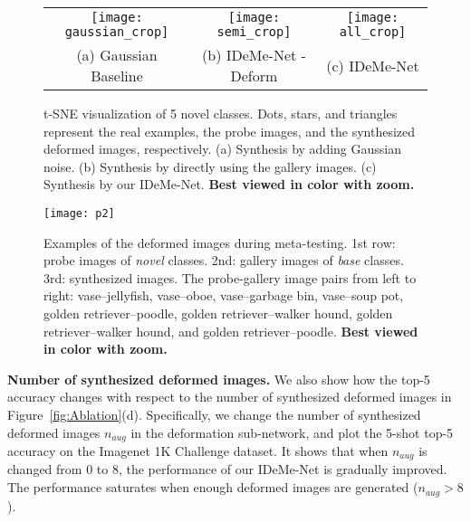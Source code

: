 \documentclass[10pt,letterpaper,twocolumn]{article}
\providecommand{\tabularnewline}{\\}
\begin{document}
\noindent 
\begin{figure}
\centering 
\begin{centering}
\begin{tabular}{ccc}
\hspace{-0.3cm}\texttt{[image: gaussian\_crop]}
\hspace{-0.4cm}  & \texttt{[image: semi\_crop]} \hspace{-0.4cm}  & \texttt{[image: all\_crop]}\tabularnewline
{\scriptsize{}{}(a) Gaussian Baseline }  & {\scriptsize{}{}(b) IDeMe-Net - Deform }  & {\scriptsize{}{}(c) IDeMe-Net}\tabularnewline
\end{tabular}
\par\end{centering}
\vspace{0.1in}
\caption{\label{fig:tsne}t-SNE visualization of 5 novel classes. Dots, stars, and triangles represent
the real examples, the probe images, and the synthesized deformed
images, respectively. (a) Synthesis by adding Gaussian noise. (b)
Synthesis by directly using the gallery images. (c) Synthesis by our
IDeMe-Net. \textbf{Best viewed in color with zoom.}}



\end{figure}

\noindent 


\begin{figure}[h]
\begin{centering}
		\texttt{[image: p2]}
		\par\end{centering}
\vspace{0.1in}
	\caption{\label{fig:example}{Examples of the deformed images during meta-testing. 1st row: probe images of {\em novel} classes. 2nd: gallery images of {\em base} classes. 3rd: synthesized images. The  probe-gallery image pairs from left to right: 
				vase--jellyfish, vase--oboe, vase--garbage bin, vase--soup pot, golden retriever--poodle, golden retriever--walker hound, golden retriever--walker hound, and golden retriever--poodle. \textbf{Best viewed in color with zoom.}}}
\end{figure}

\noindent \textbf{Number of synthesized deformed images.} We also
show how the top-5 accuracy changes with respect to the number of
synthesized deformed images in Figure~\ref{fig:Ablation}(d). Specifically,
we change the number of synthesized deformed images $n_{aug}$ in
the deformation sub-network, and plot the 5-shot top-5 accuracy
on the Imagenet 1K Challenge dataset. It shows that when $n_{aug}$ is changed
from $0$ to 8, the performance of our IDeMe-Net is gradually improved.
The performance saturates when enough deformed images
are generated ($n_{aug}>8$).
\end{document}
